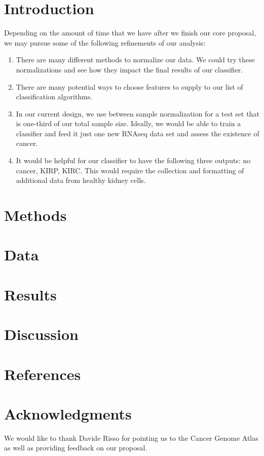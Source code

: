 \section{Introduction}

Depending on the amount of time that we have after we finish our core proposal,
we may pursue some of the following refinements of our analysis:

\begin{enumerate}

\item There are many different methods to normalize our data. We could try
these normalizations and see how they impact the final results of our
classifier. 

\item There are many potential ways to choose features to supply to our list of
classification algorithms. 

\item In our current design, we use between sample normalization for a test set
that is one-third of our total sample size. Ideally, we would be able to train
a classifier and feed it just one new RNAseq data set and assess the existence
of cancer. 

\item It would be helpful for our classifier to have the following three
outputs: no cancer, KIRP, KIRC. This would require the collection and
formatting of additional data from healthy kidney cells. 

\end{enumerate}

\section{Methods}

\section{Data}

\section{Results}

\section{Discussion}

\section{References}


\section*{Acknowledgments}
We would like to thank Davide Risso for pointing us to the Cancer Genome
Atlas as well as providing feedback on our proposal.


